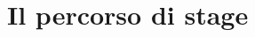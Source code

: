 \chapter{Il percorso di stage }\label{cap:Il_percorso}



\newpage
\pagestyle{empty}
\null %
\newpage